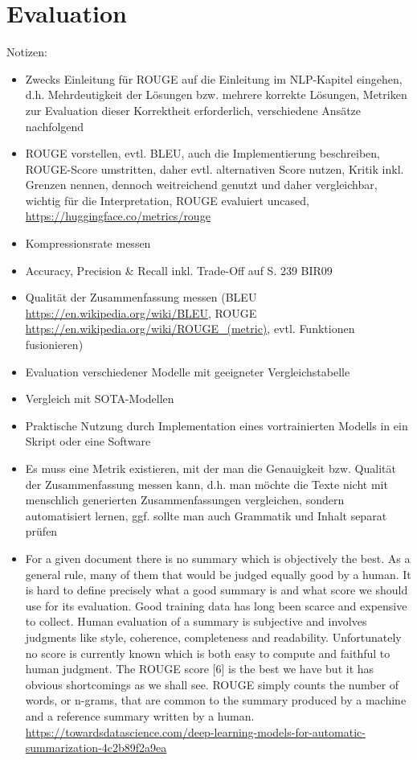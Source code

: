 \section{Evaluation}
Notizen:
\begin{itemize}
	\item Zwecks Einleitung für ROUGE auf die Einleitung im NLP-Kapitel eingehen, d.h. Mehrdeutigkeit der Lösungen bzw. mehrere korrekte Lösungen, Metriken zur Evaluation dieser Korrektheit erforderlich, verschiedene Ansätze nachfolgend
	\item ROUGE vorstellen, evtl. BLEU, auch die Implementierung beschreiben, ROUGE-Score umstritten, daher evtl. alternativen Score nutzen, Kritik inkl. Grenzen nennen, dennoch weitreichend genutzt und daher vergleichbar, wichtig für die Interpretation, ROUGE evaluiert uncased, \url{https://huggingface.co/metrics/rouge}
	\item Kompressionsrate messen
	\item Accuracy, Precision \& Recall inkl. Trade-Off auf S. 239 BIR09
	\item Qualität der Zusammenfassung messen (BLEU \url{https://en.wikipedia.org/wiki/BLEU}, ROUGE \url{https://en.wikipedia.org/wiki/ROUGE_(metric)}, evtl. Funktionen fusionieren)
	\item Evaluation verschiedener Modelle mit geeigneter Vergleichstabelle
	\item Vergleich mit SOTA-Modellen
	\item Praktische Nutzung durch Implementation eines vortrainierten Modells in ein Skript oder eine Software
	\item Es muss eine Metrik existieren, mit der man die Genauigkeit bzw. Qualität der Zusammenfassung messen kann, d.h. man möchte die Texte nicht mit menschlich generierten Zusammenfassungen vergleichen, sondern automatisiert lernen, ggf. sollte man auch Grammatik und Inhalt separat prüfen
	\item For a given document there is no summary which is objectively the best. As a general rule, many of them that would be judged equally good by a human. It is hard to define precisely what a good summary is and what score we should use for its evaluation. Good training data has long been scarce and expensive to collect. Human evaluation of a summary is subjective and involves judgments like style, coherence, completeness and readability. Unfortunately no score is currently known which is both easy to compute and faithful to human judgment. The ROUGE score [6] is the best we have but it has obvious shortcomings as we shall see. ROUGE simply counts the number of words, or n-grams, that are common to the summary produced by a machine and a reference summary written by a human. \url{https://towardsdatascience.com/deep-learning-models-for-automatic-summarization-4c2b89f2a9ea}

\end{itemize}
